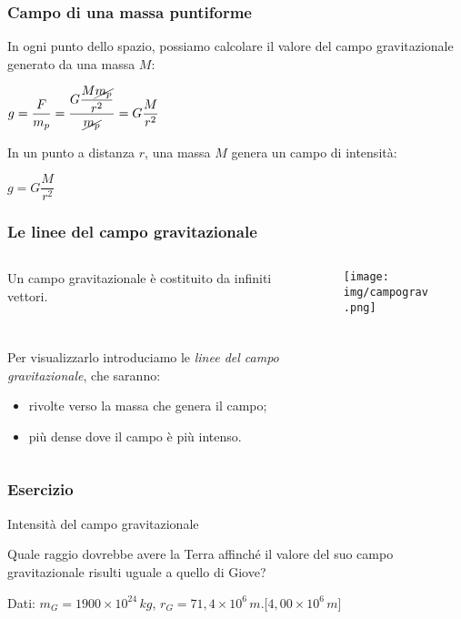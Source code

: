 \documentclass[]{beamer}
\theoremstyle{plain}
\begin{document}
\begin{frame}
\frametitle{Campo di una massa puntiforme}
In ogni punto dello spazio, possiamo calcolare il valore del campo gravitazionale generato da una massa $ M $:
\begin{center}
$ g = \dfrac{F}{m_p} = \dfrac{G \dfrac{M \cancel{m_p}}{r^2}}{\cancel{m_p}} = G \dfrac{M}{r^2} $
\end{center}\pause
In un punto a distanza $ r $, una massa $ M $ genera un campo di intensità:
\begin{center}
\colorbox{blue!30}{$ g = G \dfrac{M}{r^2} $}
\end{center}
\end{frame}





\begin{frame}
\frametitle{Le linee del campo gravitazionale}

\begin{columns}
\begin{column}{0.6\textwidth}
Un campo gravitazionale è costituito da infiniti vettori.

~

Per visualizzarlo introduciamo le \emph{linee del campo gravitazionale}, che saranno:
\begin{itemize}
  \item rivolte verso la massa che genera il campo;
  \item più dense dove il campo è più intenso.
\end{itemize}
\end{column}
\begin{column}{0.3\textwidth}
\begin{figure}
\texttt{[image: img/campograv.png]}
\end{figure}
\end{column}
\end{columns}
\end{frame}


\begin{frame}
\frametitle{Esercizio}
\begin{exampleblock}{Intensità del campo gravitazionale}
  \small{Quale raggio dovrebbe avere la Terra affinché il valore del suo campo gravitazionale risulti uguale a quello di Giove?

  Dati: $ m_{G} = 1900 \times 10^{24} \, kg $, $ r_G = 71,4 \times 10^{6} \, m $.\hspace*{\fill}[$ 4,00 \times 10^{6} \, m $]}
\end{exampleblock}
\end{frame}


\end{document}
